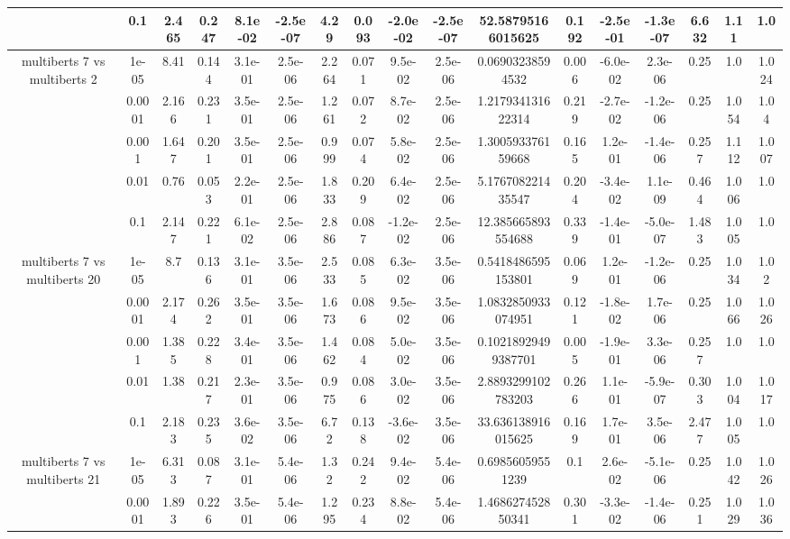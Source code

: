 \begin{tabular}{|c|c|c|c|c|c|c|c|c|c|c|c|c|c|c|c|c|}
 & 0.1 & 2.465 & 0.247 & 8.1e-02 & -2.5e-07 & 4.29 & 0.093 & -2.0e-02 & -2.5e-07 & 52.58795166015625 & 0.192 & -2.5e-01 & -1.3e-07 & 6.632 & 1.11 & 1.0 \\
\hline
\multirow{5}{*}{multiberts 7 vs multiberts 2} & 1e-05 & 8.41 & 0.144 & 3.1e-01 & 2.5e-06 & 2.264 & 0.071 & 9.5e-02 & 2.5e-06 & 0.06903238594532 & 0.006 & -6.0e-02 & 2.3e-06 & 0.25 & 1.0 & 1.024 \\
 & 0.0001 & 2.166 & 0.231 & 3.5e-01 & 2.5e-06 & 1.261 & 0.072 & 8.7e-02 & 2.5e-06 & 1.217934131622314 & 0.219 & -2.7e-02 & -1.2e-06 & 0.25 & 1.054 & 1.04 \\
 & 0.001 & 1.647 & 0.201 & 3.5e-01 & 2.5e-06 & 0.999 & 0.074 & 5.8e-02 & 2.5e-06 & 1.300593376159668 & 0.165 & 1.2e-01 & -1.4e-06 & 0.257 & 1.112 & 1.007 \\
 & 0.01 & 0.76 & 0.053 & 2.2e-01 & 2.5e-06 & 1.833 & 0.209 & 6.4e-02 & 2.5e-06 & 5.176708221435547 & 0.204 & -3.4e-02 & 1.1e-09 & 0.464 & 1.006 & 1.0 \\
 & 0.1 & 2.147 & 0.221 & 6.1e-02 & 2.5e-06 & 2.886 & 0.087 & -1.2e-02 & 2.5e-06 & 12.385665893554688 & 0.339 & -1.4e-01 & -5.0e-07 & 1.483 & 1.005 & 1.0 \\
\hline
\multirow{5}{*}{multiberts 7 vs multiberts 20} & 1e-05 & 8.7 & 0.136 & 3.1e-01 & 3.5e-06 & 2.533 & 0.085 & 6.3e-02 & 3.5e-06 & 0.5418486595153801 & 0.069 & 1.2e-01 & -1.2e-06 & 0.25 & 1.034 & 1.02 \\
 & 0.0001 & 2.174 & 0.262 & 3.5e-01 & 3.5e-06 & 1.673 & 0.086 & 9.5e-02 & 3.5e-06 & 1.0832850933074951 & 0.121 & -1.8e-02 & 1.7e-06 & 0.25 & 1.066 & 1.026 \\
 & 0.001 & 1.385 & 0.228 & 3.4e-01 & 3.5e-06 & 1.462 & 0.084 & 5.0e-02 & 3.5e-06 & 0.10218929499387701 & 0.005 & -1.9e-01 & 3.3e-06 & 0.257 & 1.0 & 1.0 \\
 & 0.01 & 1.38 & 0.217 & 2.3e-01 & 3.5e-06 & 0.975 & 0.086 & 3.0e-02 & 3.5e-06 & 2.8893299102783203 & 0.266 & 1.1e-01 & -5.9e-07 & 0.303 & 1.004 & 1.017 \\
 & 0.1 & 2.183 & 0.235 & 3.6e-02 & 3.5e-06 & 6.72 & 0.138 & -3.6e-02 & 3.5e-06 & 33.636138916015625 & 0.169 & 1.7e-01 & 3.5e-06 & 2.477 & 1.005 & 1.0 \\
\hline
\multirow{5}{*}{multiberts 7 vs multiberts 21} & 1e-05 & 6.313 & 0.087 & 3.1e-01 & 5.4e-06 & 1.32 & 0.242 & 9.4e-02 & 5.4e-06 & 0.69856059551239 & 0.1 & 2.6e-02 & -5.1e-06 & 0.25 & 1.042 & 1.026 \\
 & 0.0001 & 1.893 & 0.226 & 3.5e-01 & 5.4e-06 & 1.295 & 0.234 & 8.8e-02 & 5.4e-06 & 1.468627452850341 & 0.301 & -3.3e-02 & -1.4e-06 & 0.251 & 1.029 & 1.036 \\

\end{tabular}
